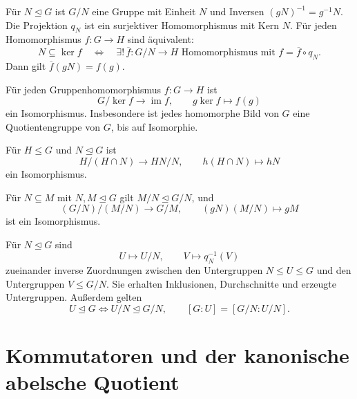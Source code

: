 \begin{theorem}
\label{b40guide:thm:quotient}
Für \(N\trianglelefteq G\) ist \(G/N\) eine Gruppe mit Einheit \(N\)
und Inversen \((gN)^{-1}=g^{-1}N\).
Die Projektion \(q_N\) ist ein surjektiver Homomorphismus mit Kern \(N\).
Für jeden Homomorphismus \(f:G\to H\) sind äquivalent:
\[
 N\subseteq\ker f
 \quad\Longleftrightarrow\quad
 \exists!\,\overline f:G/N\to H
 \text{ Homomorphismus mit }f=\overline f\circ q_N.
\]
Dann gilt \(\overline f(gN)=f(g)\).
\cite{milne,conradquot}
\end{theorem}

\begin{theorem}
\label{b40guide:thm:first-iso}
Für jeden Gruppenhomomorphismus \(f:G\to H\) ist
\[
 G/\ker f\longrightarrow\operatorname{im}f,\qquad
 g\ker f\longmapsto f(g)
\]
ein Isomorphismus. Insbesondere ist jedes homomorphe Bild von \(G\)
eine Quotientengruppe von \(G\), bis auf Isomorphie. \cite{milne}
\end{theorem}

\begin{theorem}
Für \(H\leq G\) und \(N\trianglelefteq G\) ist
\[
 H/(H\cap N)\longrightarrow HN/N,\qquad
 h(H\cap N)\longmapsto hN
\]
ein Isomorphismus. \cite{milne}
\end{theorem}

\begin{theorem}
Für \(N\subseteq M\) mit \(N,M\trianglelefteq G\) gilt
\(M/N\trianglelefteq G/N\), und
\[
 (G/N)/(M/N)\longrightarrow G/M,\qquad
 (gN)(M/N)\longmapsto gM
\]
ist ein Isomorphismus. \cite{milne}
\end{theorem}

\begin{theorem}[Untergruppenkorrespondenz]
Für \(N\trianglelefteq G\) sind
\[
 U\longmapsto U/N,\qquad V\longmapsto q_N^{-1}(V)
\]
zueinander inverse Zuordnungen zwischen den Untergruppen
\(N\leq U\leq G\) und den Untergruppen \(V\leq G/N\).
Sie erhalten Inklusionen, Durchschnitte und erzeugte Untergruppen.
Außerdem gelten
\[
 U\trianglelefteq G\iff U/N\trianglelefteq G/N,\qquad
 [G:U]=[G/N:U/N].
\]
\cite{milne}
\end{theorem}

\section{Kommutatoren und der kanonische abelsche Quotient}

